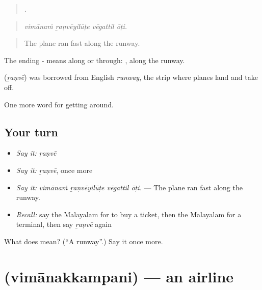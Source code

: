 \begin{quote}
   .
\end{quote}

\begin{quote}
\emph{vimānaṁ ṟaṇvēyilūṭe vēgattil ōṭi.}
\end{quote}

\begin{quote}
The plane ran fast along the runway.
\end{quote}

The ending - means along or through: , along the runway.

\begin{cousinweb}
\textbf{} (\emph{ṟaṇvē}) was borrowed from English \emph{runway}, the strip where planes land and take off.
\end{cousinweb}

\begin{grammarlens}[title={What you've built}]
One more word for getting around.
\end{grammarlens}

\subsection*{Your turn}
\begin{itemize}
\raggedright
  \item \emph{Say it:} \emph{ṟaṇvē}
  \item \emph{Say it:} \emph{ṟaṇvē}, once more
  \item \emph{Say it:} \emph{vimānaṁ ṟaṇvēyilūṭe vēgattil ōṭi.} — The plane ran fast along the runway.
  \item \emph{Recall:} say the Malayalam for to buy a ticket, then the Malayalam for a terminal, then say \emph{ṟaṇvē} again
\end{itemize}

\begin{tcolorbox}[breakable,colback=teal!4,colframe=teal!35!black,title={Before you move on}]
What does  mean? (\textquotedblleft{}A runway\textquotedblright{}.) Say it once more.
\end{tcolorbox}
\section[\texorpdfstring{\ml{വിമാനക്കമ്പനി} (vimānakkampani)}{വിമാനക്കമ്പനി (vimānakkampani)}]{ (vimānakkampani) — an airline}

